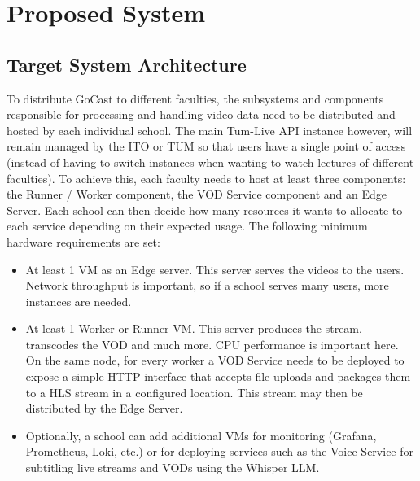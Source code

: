 \section{Proposed System}

\subsection{Target System Architecture}

To distribute GoCast to different faculties, the subsystems and components responsible for processing and handling video data need to be distributed and hosted by each individual school. 
The main Tum-Live \ac{API} instance however, will remain managed by the \ac{ITO} or TUM so that users have a single point of access (instead of having to switch instances when wanting to watch lectures of different faculties).
To achieve this, each faculty needs to host at least three components: the Runner / Worker component, the VOD Service component and an Edge Server. 
Each school can then decide how many resources it wants to allocate to each service depending on their expected usage. The following minimum hardware requirements are set:

\begin{itemize}
    \item At least 1 \ac{VM} as an Edge server. This server serves the videos to the users. Network throughput is important, so if a school serves many users, more instances are needed.
    \item At least 1 Worker or Runner \ac{VM}. This server produces the stream, transcodes the \ac{VOD} and much more. CPU performance is important here. On the same node, for every worker a VOD Service needs to be deployed to expose a simple HTTP interface that accepts file uploads and packages them to a \ac{HLS} stream in a configured location. This stream may then be distributed by the Edge Server.
    \item Optionally, a school can add additional \ac{VM}s for monitoring (Grafana, Prometheus, Loki, etc.) or for deploying services such as the Voice Service for subtitling live streams and \ac{VOD}s using the Whisper LLM.
\end{itemize}

